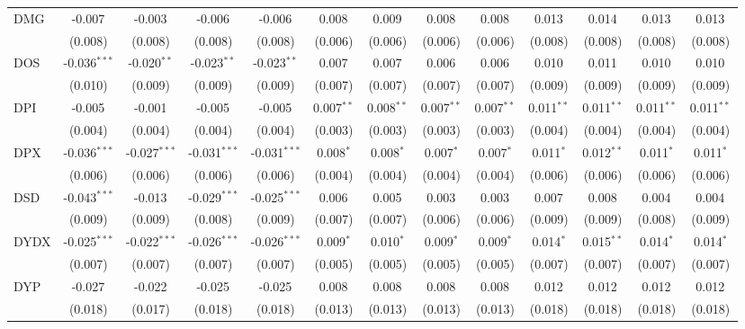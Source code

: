 \begin{table}[!htbp]
\begin{tabular}{@{\extracolsep{5pt}}lcccccccccccc}
 DMG & -0.007$^{}$ & -0.003$^{}$ & -0.006$^{}$ & -0.006$^{}$ & 0.008$^{}$ & 0.009$^{}$ & 0.008$^{}$ & 0.008$^{}$ & 0.013$^{}$ & 0.014$^{}$ & 0.013$^{}$ & 0.013$^{}$ \\
  & (0.008) & (0.008) & (0.008) & (0.008) & (0.006) & (0.006) & (0.006) & (0.006) & (0.008) & (0.008) & (0.008) & (0.008) \\
 DOS & -0.036$^{***}$ & -0.020$^{**}$ & -0.023$^{**}$ & -0.023$^{**}$ & 0.007$^{}$ & 0.007$^{}$ & 0.006$^{}$ & 0.006$^{}$ & 0.010$^{}$ & 0.011$^{}$ & 0.010$^{}$ & 0.010$^{}$ \\
  & (0.010) & (0.009) & (0.009) & (0.009) & (0.007) & (0.007) & (0.007) & (0.007) & (0.009) & (0.009) & (0.009) & (0.009) \\
 DPI & -0.005$^{}$ & -0.001$^{}$ & -0.005$^{}$ & -0.005$^{}$ & 0.007$^{**}$ & 0.008$^{**}$ & 0.007$^{**}$ & 0.007$^{**}$ & 0.011$^{**}$ & 0.011$^{**}$ & 0.011$^{**}$ & 0.011$^{**}$ \\
  & (0.004) & (0.004) & (0.004) & (0.004) & (0.003) & (0.003) & (0.003) & (0.003) & (0.004) & (0.004) & (0.004) & (0.004) \\
 DPX & -0.036$^{***}$ & -0.027$^{***}$ & -0.031$^{***}$ & -0.031$^{***}$ & 0.008$^{*}$ & 0.008$^{*}$ & 0.007$^{*}$ & 0.007$^{*}$ & 0.011$^{*}$ & 0.012$^{**}$ & 0.011$^{*}$ & 0.011$^{*}$ \\
  & (0.006) & (0.006) & (0.006) & (0.006) & (0.004) & (0.004) & (0.004) & (0.004) & (0.006) & (0.006) & (0.006) & (0.006) \\
 DSD & -0.043$^{***}$ & -0.013$^{}$ & -0.029$^{***}$ & -0.025$^{***}$ & 0.006$^{}$ & 0.005$^{}$ & 0.003$^{}$ & 0.003$^{}$ & 0.007$^{}$ & 0.008$^{}$ & 0.004$^{}$ & 0.004$^{}$ \\
  & (0.009) & (0.009) & (0.008) & (0.009) & (0.007) & (0.007) & (0.006) & (0.006) & (0.009) & (0.009) & (0.008) & (0.009) \\
 DYDX & -0.025$^{***}$ & -0.022$^{***}$ & -0.026$^{***}$ & -0.026$^{***}$ & 0.009$^{*}$ & 0.010$^{*}$ & 0.009$^{*}$ & 0.009$^{*}$ & 0.014$^{*}$ & 0.015$^{**}$ & 0.014$^{*}$ & 0.014$^{*}$ \\
  & (0.007) & (0.007) & (0.007) & (0.007) & (0.005) & (0.005) & (0.005) & (0.005) & (0.007) & (0.007) & (0.007) & (0.007) \\
 DYP & -0.027$^{}$ & -0.022$^{}$ & -0.025$^{}$ & -0.025$^{}$ & 0.008$^{}$ & 0.008$^{}$ & 0.008$^{}$ & 0.008$^{}$ & 0.012$^{}$ & 0.012$^{}$ & 0.012$^{}$ & 0.012$^{}$ \\
  & (0.018) & (0.017) & (0.018) & (0.018) & (0.013) & (0.013) & (0.013) & (0.013) & (0.018) & (0.018) & (0.018) & (0.018) \\

\end{tabular}
\end{table}
